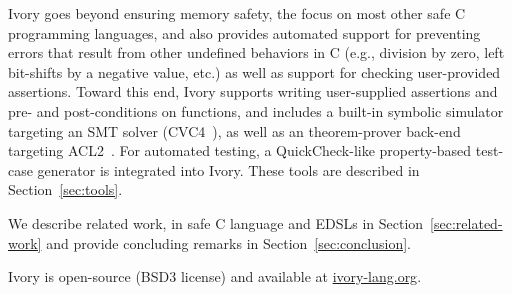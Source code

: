 Ivory goes beyond ensuring memory safety, the focus on most other safe C
programming languages, and also provides automated support for preventing errors
that result from other undefined behaviors in C (e.g., division by zero, left
bit-shifts by a negative value, etc.) as well as support for checking
user-provided assertions. Toward this end, Ivory supports writing user-supplied
assertions and pre- and post-conditions on functions, and includes a built-in
symbolic simulator targeting an SMT solver (CVC4~\cite{cvc4}), as well as an
theorem-prover back-end targeting ACL2~\cite{acl2}. For automated testing, a
QuickCheck-like property-based test-case generator is integrated into
Ivory. These tools are described in Section~\ref{sec:tools}.

We describe related work, in safe C language and EDSLs in
Section~\ref{sec:related-work} and provide concluding remarks in
Section~\ref{sec:conclusion}.

Ivory is open-source (BSD3 license) and available at \url{ivory-lang.org}.
